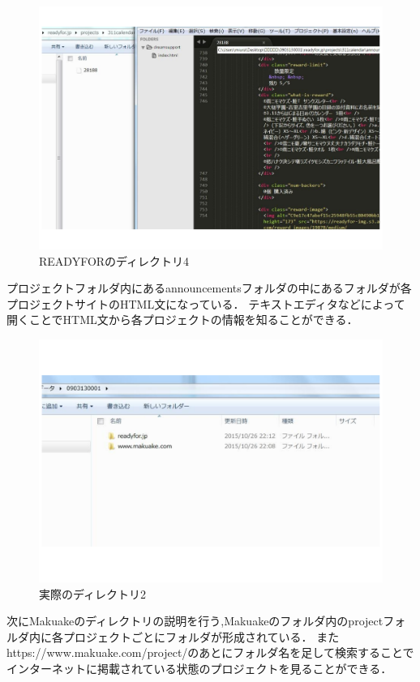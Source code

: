 \begin{figure}[H]
\centering
\includegraphics[width=13cm]{figure32.pdf}
\caption{READYFORのディレクトリ4}\label{sannp}
\end{figure}


プロジェクトフォルダ内にあるannouncementsフォルダの中にあるフォルダが各プロジェクトサイトのHTML文になっている．
テキストエディタなどによって開くことでHTML文から各プロジェクトの情報を知ることができる．

\begin{figure}[H]
\centering
\includegraphics[width=13cm]{figure33.pdf}
\caption{実際のディレクトリ2}\label{sannp}
\end{figure}

次にMakuakeのディレクトリの説明を行う,Makuakeのフォルダ内のprojectフォルダ内に各プロジェクトごとにフォルダが形成されている．
またhttps://www.makuake.com/project/のあとにフォルダ名を足して検索することでインターネットに掲載されている状態のプロジェクトを見ることができる．

